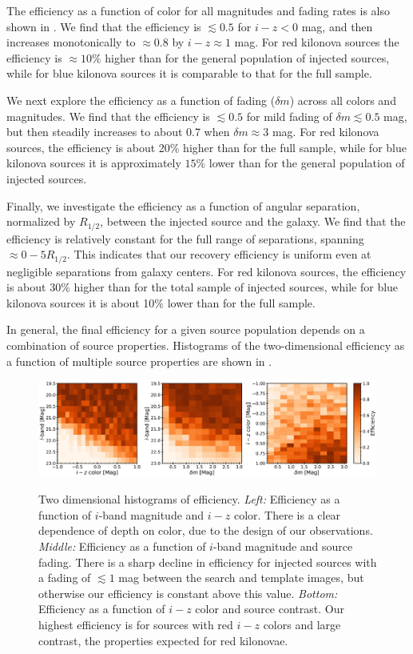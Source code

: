 The efficiency as a function of color for all magnitudes and fading rates is also shown in . We find that the efficiency is $\lesssim 0.5$ for $i-z<0$ mag, and then increases monotonically to $\approx 0.8$ by $i-z\approx 1$ mag. For red kilonova sources the efficiency is $\approx10\%$ higher than for the general population of injected sources, while for blue kilonova sources it is comparable to that for the full sample.

We next explore the efficiency as a function of fading ($\delta m$) across all colors and magnitudes. We find that the efficiency is $\lesssim 0.5$ for mild fading of $\delta m\lesssim 0.5$ mag, but then steadily increases to about 0.7 when $\delta m\approx 3$ mag. For red kilonova sources, the efficiency is about 20\% higher than for the full sample, while for blue kilonova sources it is approximately $15$\% lower than for the general population of injected sources.

Finally, we investigate the efficiency as a function of angular separation, normalized by $R_{1/2}$, between the injected source and the galaxy. We find that the efficiency is relatively constant for the full range of separations, spanning $\approx 0-5 R_{1/2}$. This indicates that our recovery efficiency is uniform even at negligible separations from galaxy centers. For red kilonova sources, the efficiency is about 30\% higher than for the total sample of injected sources, while for blue kilonova sources it is about 10\% lower than for the full sample.

In general, the final efficiency for a given source population depends on a combination of source properties. Histograms of the two-dimensional efficiency as a function of multiple source properties are shown in .

\begin{figure}[!t]
\begin{center}
\hspace*{-0.1in}
\scalebox{1.}
{\includegraphics[width=\textwidth]{./figs/chapter3/f7alt.pdf}}
\caption{\singlespace Two dimensional histograms of efficiency. {\it Left:} Efficiency as a function of $i$-band magnitude and $i-z$ color. There is a clear dependence of depth on color, due to the design of our observations. {\it Middle:} Efficiency as a function of $i$-band magnitude and source fading. There is a sharp decline in efficiency for injected sources with a fading of $\lesssim 1$ mag between the search and template images, but otherwise our efficiency is constant above this value. {\it Bottom:} Efficiency as a function of $i-z$ color and source contrast. Our highest efficiency is for sources with red $i-z$ colors and large contrast, the properties expected for red kilonovae.}
\label{fig:ch3_eff_2D}
\end{center}
\end{figure}


